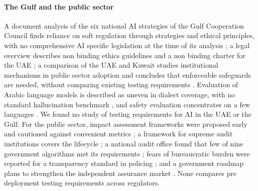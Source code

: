 \documentclass[conference]{IEEEtran}
\begin{document}
\paragraph{The Gulf and the public sector} A document analysis of the six national AI strategies of the Gulf Cooperation Council finds reliance on soft regulation through strategies and ethical principles, with no comprehensive AI specific legislation at the time of its analysis \citep{albous2025gcc}; a legal overview describes non binding ethics guidelines and a non binding charter for the UAE \citep{hofverberg2024falqs}; a comparison of the UAE and Kuwait studies institutional mechanisms in public sector adoption and concludes that enforceable safeguards are needed, without comparing existing testing requirements \citep{albous2025kuwaituae}. Evaluation of Arabic language models is described as uneven in dialect coverage, with no standard hallucination benchmark \citep{alzubaidi2025evaluating}, and safety evaluation concentrates on a few languages \citep{peppin2025multilingual}. We found no study of testing requirements for AI in the UAE or the Gulf. For the public sector, impact assessment frameworks were proposed early \citep{reisman2018aia} and cautioned against convenient metrics \citep{metcalf2021aias}; a framework for supreme audit institutions covers the lifecycle \citep{brand2025sai}; a national audit office found that few of nine government algorithms met its requirements \citep{rekenkamer2022audit9}; fears of bureaucratic burden were reported for a transparency standard in policing \citep{zilka2023police}; and a government roadmap plans to strengthen the independent assurance market \citep{dsit2025assurance}. None compares pre deployment testing requirements across regulators.
\end{document}
